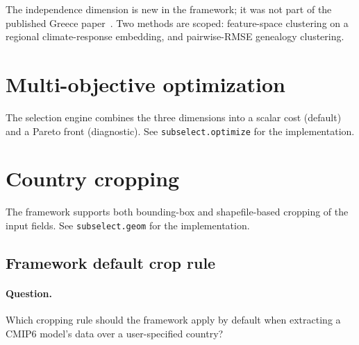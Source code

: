\documentclass[11pt,a4paper]{article}
\begin{document}
The independence dimension is new in the framework; it was not part of the
published Greece paper~\citep{tsilimigkras2026subselection}. Two methods are
scoped: feature-space clustering on a regional climate-response embedding,
and pairwise-RMSE genealogy clustering.


\section{Multi-objective optimization}\label{sec:optimization}

The selection engine combines the three dimensions into a scalar cost
(default) and a Pareto front (diagnostic). See \texttt{subselect.optimize}
for the implementation.


\section{Country cropping}\label{sec:cropping}

The framework supports both bounding-box and shapefile-based cropping of
the input fields. See \texttt{subselect.geom} for the implementation.


\subsection{Framework default crop rule}\label{sec:cropping-default}

\paragraph{Question.} Which cropping rule should the framework apply by default
when extracting a CMIP6 model's data over a user-specified country?
\end{document}
